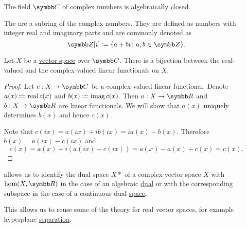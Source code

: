 \begin{Theorem}\label{thm:fundamental_theorem_of_algebra}
  The field \( \BC \) of complex numbers is algebraically \hyperref[def:algebraically_closed_field]{closed}.
\end{Theorem}

\begin{Definition}\label{def:gaussian_integers}
  The  are a subring of the complex numbers. They are defined as numbers with integer real and imaginary parts and are commonly denoted as
  \begin{equation*}
    \BZ[i] \coloneqq \{ a + bi \colon a, b \in \BZ \}.
  \end{equation*}
\end{Definition}

\begin{Theorem}\label{thm:linear_functionals_over_c}
  Let \( X \) be a \hyperref[def:vector_space]{vector space} over \( \BC \). There is a bijection between the real-valued and the complex-valued linear functionals on \( X \).
\end{Theorem}
\begin{proof}
  Let \( c: X \to \BC \) be a complex-valued linear functional. Denote \( a(x) \coloneqq \operatorname{real} c(x) \) and \( b(x) \coloneqq \operatorname{imag} c(x) \). Then \( a: X \to \BR \) and \( b: X \to \BR \) are linear functionals. We will show that \( a(x) \) uniquely determines \( b(x) \) and hence \( c(x) \).

  Note that \( c(ix) = a(ix) + i b(ix) = i a(x) - b(x) \). Therefore \( b(x) = a(ix) - c(ix) \) and
  \begin{equation*}
    c(x) = a(x) + i (a(ix) - c(ix)) = a(x) - a(x) + c(x) = c(x).
  \end{equation*}
\end{proof}

\begin{Remark}\label{remark:linear_functionals_over_c}
   allows us to identify the dual space \( X* \) of a complex vector space \( X \) with \( \Hom(X, \BR) \) in the case of an algebraic \hyperref[def:dual_vector_space]{dual} or with the corresponding subspace in the case of a continuous dual \hyperref[def:continuous_dual_space]{space}.

  This allows us to reuse some of the theory for real vector spaces, for example hyperplane \hyperref[def:hyperplane_separation]{separation}.
\end{Remark}
